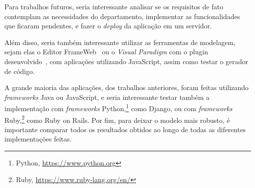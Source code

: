 
Para trabalhos futuros, seria interessante analisar se os requisitos de fato contemplam as necessidades do departamento,
implementar as funcionalidades que ficaram pendentes, e fazer o \textit{deploy} da aplicação em um servidor.

Além disso, seria também interessante utilizar as ferramentas de modelagem, sejam elas o Editor FrameWeb~\cite{campos:2017} ou o \textit{Visual Paradigm} com o plugin desenvolvido~\cite{silva:2023},
com aplicações utilizando JavaScript, assim como testar o gerador de código.

A grande maioria das aplicações, dos trabalhos anteriores, foram feitas utilizando \textit{frameworks} Java ou JavaScript, e seria interessante
testar também a implementação com \textit{frameworks} Python,\footnote{Python, \url{https://www.python.org}} como Django, ou com \textit{frameworks} Ruby,\footnote{Ruby, \url{https://www.ruby-lang.org/en/}} como Ruby on Rails.
Por fim, para deixar o modelo mais robusto, é importante comparar todos os resultados obtidos ao longo de todas as diferentes implementações feitas.

